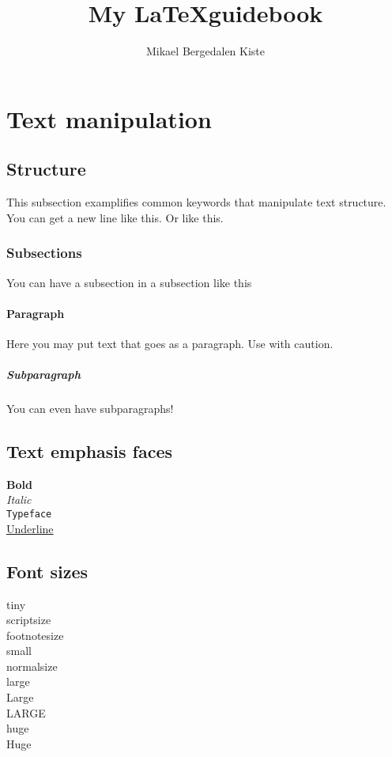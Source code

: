 \documentclass[a4paper, 10pt]{article}
\title{My \LaTeX \space guidebook}
\author{Mikael Bergedalen Kiste}
\begin{document}
 \maketitle
 
 \section{Text manipulation}
 
\subsection{Structure}
 This subsection examplifies common keywords that manipulate text structure. \\You can get a new line like this. \newline Or like this.
 \subsubsection{Subsections}
 You can have a subsection in a subsection like this
 \paragraph{Paragraph}
 Here you may put text that goes as a paragraph. Use with caution.
 \subparagraph{Subparagraph} You can even have subparagraphs!
 
 \subsection{Text emphasis faces}
 \textbf{Bold}\\
 {\it Italic}\\
 \texttt{Typeface}\\
 \underline {Underline}
 
 \subsection{Font sizes}
  {\tiny tiny}\\
  {\scriptsize scriptsize}\\
  {\footnotesize footnotesize}\\
  {\small small} \\
  {\normalsize normalsize}\\
  {\large large}\\
  {\Large Large}\\
  {\LARGE LARGE}\\
  {\huge huge}\\
  {\Huge Huge}
\end{document}
